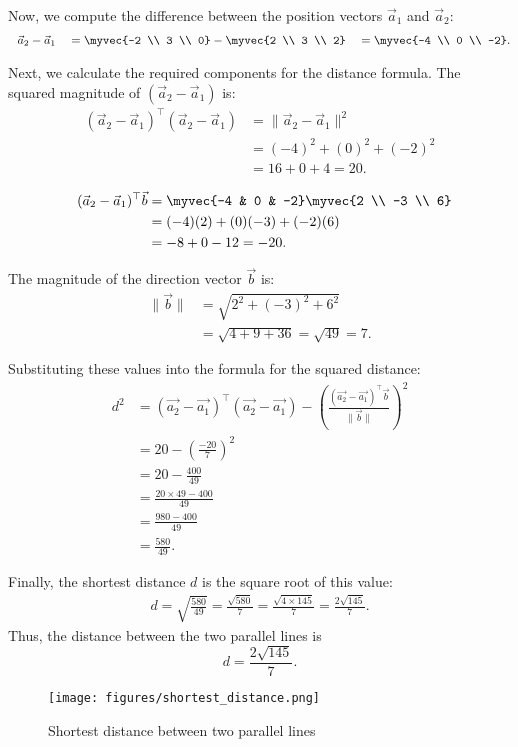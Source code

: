\documentclass[12pt]{article}
\begin{document}
Now, we compute the difference between the position vectors $\vec{a}_1$ and $\vec{a}_2$:
\begin{align}
    \vec{a}_2 - \vec{a}_1 
    = \myvec{-2 \\ 3 \\ 0} - \myvec{2 \\ 3 \\ 2} 
    = \myvec{-4 \\ 0 \\ -2}.
\end{align}

Next, we calculate the required components for the distance formula.
The squared magnitude of $(\vec{a}_2 - \vec{a}_1)$ is:
\begin{align}
    (\vec{a}_2 - \vec{a}_1)^\top (\vec{a}_2 - \vec{a}_1) &= \lVert \vec{a}_2 - \vec{a}_1 \rVert^2 \\
    &= (-4)^2 + (0)^2 + (-2)^2 \\
    &= 16 + 0 + 4 = 20.
\end{align}


\begin{align}
    (\vec{a}_2 - \vec{a}_1)^\top \vec{b} &= \myvec{-4 & 0 & -2} \myvec{2 \\ -3 \\ 6} \\
    &= (-4)(2) + (0)(-3) + (-2)(6) \\
    &= -8 + 0 - 12 = -20.
\end{align}

The magnitude of the direction vector $\vec{b}$ is:
\begin{align}
    \lVert \vec{b} \rVert &= \sqrt{2^2 + (-3)^2 + 6^2} \\
    &= \sqrt{4 + 9 + 36} = \sqrt{49} = 7.
\end{align}

Substituting these values into the formula for the squared distance:
\begin{align}
    d^2 
    &= (\vec{a_2} - \vec{a_1})^\top (\vec{a_2} - \vec{a_1})
    - \left( \frac{ (\vec{a_2} - \vec{a_1})^\top \vec{b} }{ \lVert \vec{b} \rVert } \right)^2 \\[6pt]
    &= 20 - \left( \frac{-20}{7} \right)^2 \\[6pt]
    &= 20 - \frac{400}{49} \\[6pt]
    &= \frac{20 \times 49 - 400}{49} \\[6pt]
    &= \frac{980 - 400}{49} \\[6pt]
    &= \frac{580}{49}.
\end{align}

Finally, the shortest distance $d$ is the square root of this value:
\begin{align}
    d = \sqrt{\frac{580}{49}} = \frac{\sqrt{580}}{7} = \frac{\sqrt{4 \times 145}}{7} = \frac{2\sqrt{145}}{7}.
\end{align}
Thus, the distance between the two parallel lines is
\[
\boxed{d = \frac{2\sqrt{145}}{7}}.
\]
\newpage
\begin{figure}[h]
    \centering
    \texttt{[image: figures/shortest\_distance.png]}
    \caption{Shortest distance between two parallel lines}
    \label{fig:placeholder}
\end{figure}
\end{document}
